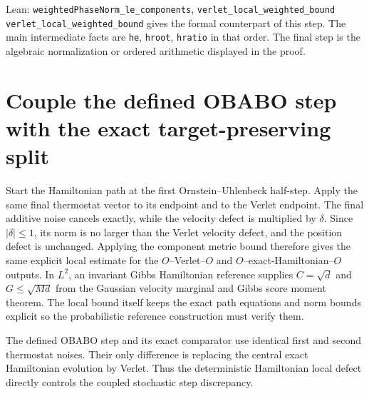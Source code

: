 \documentclass[11pt,a4paper]{article}
\begin{document}
\begin{leanbox}{Lean: \texttt{weightedPhaseNorm\_\allowbreak{}le\_\allowbreak{}components}, \texttt{verlet\_\allowbreak{}local\_\allowbreak{}weighted\_\allowbreak{}bound}}
\texttt{verlet\_\allowbreak{}local\_\allowbreak{}weighted\_\allowbreak{}bound} gives the formal counterpart of this step. The main intermediate facts are \texttt{he}, \texttt{hroot}, \texttt{hratio} in that order. The final step is the algebraic normalization or ordered arithmetic displayed in the proof.
\end{leanbox}

\section{\texorpdfstring{Couple the defined OBABO step with the exact target-preserving split}{Couple the defined OBABO step with the exact target-preserving split}}


Start the Hamiltonian path at the first Ornstein–Uhlenbeck half-step. Apply the same final thermostat vector to its endpoint and to the Verlet endpoint. The final additive noise cancels exactly, while the velocity defect is multiplied by \(\delta\). Since \(|\delta|\le1\), its norm is no larger than the Verlet velocity defect, and the position defect is unchanged. Applying the component metric bound therefore gives the same explicit local estimate for the \(O\)–Verlet–\(O\) and \(O\)–exact-Hamiltonian–\(O\) outputs. In \(L^{2}\), an invariant Gibbs Hamiltonian reference supplies \(C=\sqrt d\) and \(G\le\sqrt{Md}\) from the Gaussian velocity marginal and Gibbs score moment theorem. The local bound itself keeps the exact path equations and norm bounds explicit so the probabilistic reference construction must verify them.



The defined OBABO step and its exact comparator use identical first and second thermostat noises. Their only difference is replacing the central exact Hamiltonian evolution by Verlet. Thus the deterministic Hamiltonian local defect directly controls the coupled stochastic step discrepancy.
\end{document}
